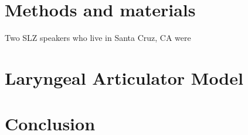 \documentclass[12pt, letterpaper]{article}
\begin{document}
\section{Methods and materials} \label{sec:Methods}

Two SLZ speakers who live in Santa Cruz, CA were 

\section{Laryngeal Articulator Model} \label{sec:LAM}



\section{Conclusion} \label{sec:Conclusion}




\printbibliography[heading=bibintoc]
\end{document}
